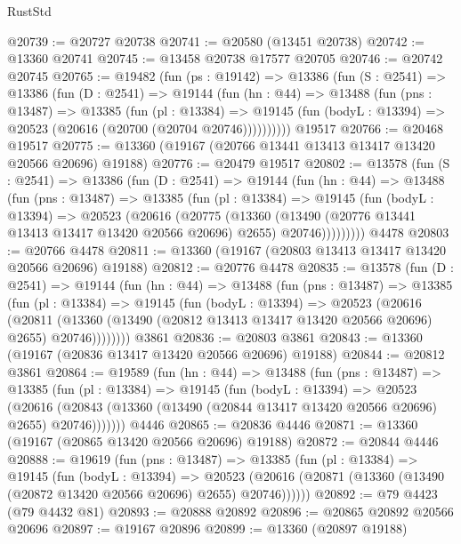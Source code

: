 \begin{lexlean}{RustStd}
\begin{coremodule}
@20739 := @20727 @20738
@20741 := @20580 (@13451 @20738)
@20742 := @13360 @20741
@20745 := @13458 @20738 @17577 @20705
@20746 := @20742 @20745
@20765 := @19482
    (fun (ps : @19142) =>
    @13386
      (fun (S : @2541) =>
      @13386
        (fun (D : @2541) =>
        @19144
          (fun (hn : @44) =>
          @13488
            (fun (pns : @13487) =>
            @13385
              (fun (pl : @13384) =>
              @19145 (fun (bodyL : @13394) => @20523 (@20616 (@20700 (@20704 @20746))))))))))
    @19517
@20766 := @20468 @19517
@20775 := @13360 (@19167 (@20766 @13441 @13413 @13417 @13420 @20566 @20696) @19188)
@20776 := @20479 @19517
@20802 := @13578
    (fun (S : @2541) =>
    @13386
      (fun (D : @2541) =>
      @19144
        (fun (hn : @44) =>
        @13488
          (fun (pns : @13487) =>
          @13385
            (fun (pl : @13384) =>
            @19145
              (fun (bodyL : @13394) =>
              @20523
                (@20616
                  (@20775
                    (@13360
                      (@13490 (@20776 @13441 @13413 @13417 @13420 @20566 @20696) @2655)
                      @20746)))))))))
    @4478
@20803 := @20766 @4478
@20811 := @13360 (@19167 (@20803 @13413 @13417 @13420 @20566 @20696) @19188)
@20812 := @20776 @4478
@20835 := @13578
    (fun (D : @2541) =>
    @19144
      (fun (hn : @44) =>
      @13488
        (fun (pns : @13487) =>
        @13385
          (fun (pl : @13384) =>
          @19145
            (fun (bodyL : @13394) =>
            @20523
              (@20616
                (@20811
                  (@13360 (@13490 (@20812 @13413 @13417 @13420 @20566 @20696) @2655) @20746))))))))
    @3861
@20836 := @20803 @3861
@20843 := @13360 (@19167 (@20836 @13417 @13420 @20566 @20696) @19188)
@20844 := @20812 @3861
@20864 := @19589
    (fun (hn : @44) =>
    @13488
      (fun (pns : @13487) =>
      @13385
        (fun (pl : @13384) =>
        @19145
          (fun (bodyL : @13394) =>
          @20523
            (@20616
              (@20843 (@13360 (@13490 (@20844 @13417 @13420 @20566 @20696) @2655) @20746)))))))
    @4446
@20865 := @20836 @4446
@20871 := @13360 (@19167 (@20865 @13420 @20566 @20696) @19188)
@20872 := @20844 @4446
@20888 := @19619
    (fun (pns : @13487) =>
    @13385
      (fun (pl : @13384) =>
      @19145
        (fun (bodyL : @13394) =>
        @20523 (@20616 (@20871 (@13360 (@13490 (@20872 @13420 @20566 @20696) @2655) @20746))))))
@20892 := @79 @4423 (@79 @4432 @81)
@20893 := @20888 @20892
@20896 := @20865 @20892 @20566 @20696
@20897 := @19167 @20896
@20899 := @13360 (@20897 @19188)

\end{coremodule}
\end{lexlean}
